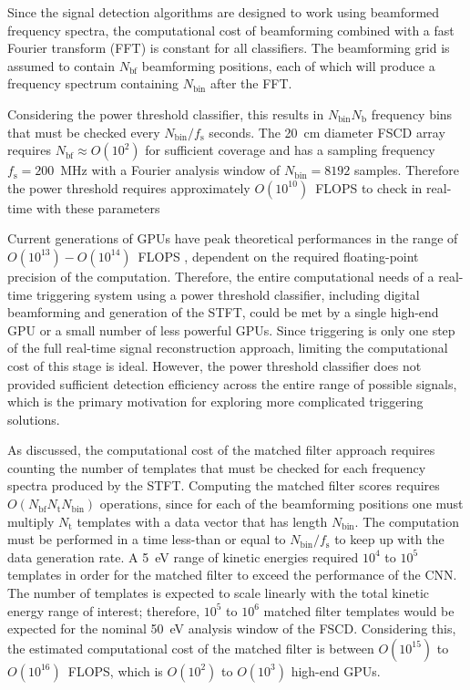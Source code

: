 Since the signal detection algorithms are designed to work using beamformed frequency spectra, the computational cost of beamforming combined with a fast Fourier transform (FFT) is constant for all classifiers. The beamforming grid is assumed to contain $N_\mathrm{bf}$ beamforming positions, each of which will produce a frequency spectrum containing $N_\mathrm{bin}$ after the FFT. 

Considering the power threshold classifier, this results in $N_\mathrm{bin}N_\mathrm{b}$ frequency bins that must be checked every $N_\mathrm{bin}/f_\mathrm{s}$ seconds. The 20~cm diameter FSCD array requires $N_\mathrm{bf}\approx O(10^2)$ for sufficient coverage and has a sampling frequency $f_\mathrm{s}=200$~MHz with a Fourier analysis window of $N_\mathrm{bin}=8192$ samples. Therefore the power threshold requires approximately $O(10^{10})$~FLOPS to check in real-time with these parameters

Current generations of GPUs have peak theoretical performances in the range of $O(10^{13})-O(10^{14})$~FLOPS \cite{h100}, dependent on the required floating-point precision of the computation. Therefore, the entire computational needs of a real-time triggering system using a power threshold classifier, including digital beamforming and generation of the STFT, could be met by a single high-end GPU or a small number of less powerful GPUs. Since triggering is only one step of the full real-time signal reconstruction approach, limiting the computational cost of this stage is ideal. However, the power threshold classifier does not provided sufficient detection efficiency across the entire range of possible signals, which is the primary motivation for exploring more complicated triggering solutions. 

As discussed, the computational cost of the matched filter approach requires counting the number of templates that must be checked for each frequency spectra produced by the STFT. Computing the matched filter scores requires $O(N_\mathrm{bf}N_\mathrm{t}N_\mathrm{bin})$ operations, since for each of the beamforming positions one must multiply $N_\mathrm{t}$ templates with a data vector that has length $N_\mathrm{bin}$. The computation must be performed in a time less-than or equal to $N_\mathrm{bin}/f_\mathrm{s}$ to keep up with the data generation rate. A 5~eV range of kinetic energies required $10^4$ to $10^5$ templates in order for the matched filter to exceed the performance of the CNN. The number of templates is expected to scale linearly with the total kinetic energy range of interest; therefore, $10^5$ to $10^6$ matched filter templates would be expected for the nominal 50~eV analysis window of the FSCD. Considering this, the estimated computational cost of the matched filter is between $O(10^{15})$ to $O(10^{16})$~FLOPS, which is $O(10^2)$ to $O(10^3)$ high-end GPUs.

